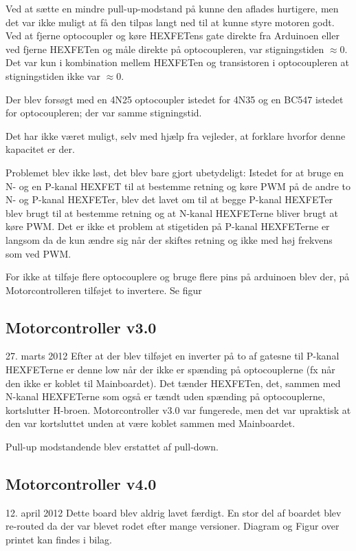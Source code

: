 \documentclass[a4paper,twoside,article,danish,table]{memoir}
\newcommand{\boarddate}[1]{\textcolor{blue!80!black}{#1}}
\begin{document}
Ved at sætte en mindre pull-up-modstand på kunne den aflades hurtigere, men det var ikke muligt at få den tilpas langt ned til at kunne styre motoren godt. Ved at fjerne optocoupler og køre HEXFETens gate direkte fra Arduinoen eller ved fjerne HEXFETen og måle direkte på optocoupleren, var stigningstiden $\approx0$. Det var kun i kombination mellem HEXFETen og transistoren i optocoupleren at stigningstiden ikke var $\approx0$.

Der blev forsøgt med en 4N25 optocoupler istedet for 4N35 og en BC547 istedet for optocoupleren; der var samme stigningstid.

Det har ikke været muligt, selv med hjælp fra vejleder, at forklare hvorfor denne kapacitet er der.

Problemet blev ikke løst, det blev bare gjort ubetydeligt: Istedet for at bruge en N- og en P-kanal HEXFET til at bestemme retning og køre PWM på de andre to N- og P-kanal HEXFETer, blev det lavet om til at begge P-kanal HEXFETer blev brugt til at bestemme retning og at N-kanal HEXFETerne bliver brugt at køre PWM. Det er ikke et problem at stigetiden på P-kanal HEXFETerne er langsom da de kun ændre sig når der skiftes retning og ikke med høj frekvens som ved PWM.

For ikke at tilføje flere optocouplere og bruge flere pins på arduinoen blev der, på Motorcontrolleren tilføjet to invertere. Se figur 
\subsection{Motorcontroller v3.0}
\boarddate{27. marts 2012}
Efter at der blev tilføjet en inverter på to af gatesne til P-kanal HEXFETerne er denne low når der ikke er spænding på optocouplerne (fx når den ikke er koblet til Mainboardet). Det tænder HEXFETen, det, sammen med N-kanal HEXFETerne som også er tændt uden spænding på optocouplerne, kortslutter H-broen. Motorcontroller v3.0 var fungerede, men det var upraktisk at den var kortsluttet unden at være koblet sammen med Mainboardet.

Pull-up modstandende blev erstattet af pull-down.
\subsection{Motorcontroller v4.0}
\boarddate{12. april 2012} Dette board blev aldrig lavet færdigt. En stor del af boardet blev re-routed da der var blevet rodet efter mange versioner. Diagram og Figur over printet kan findes i bilag. 
\end{document}
